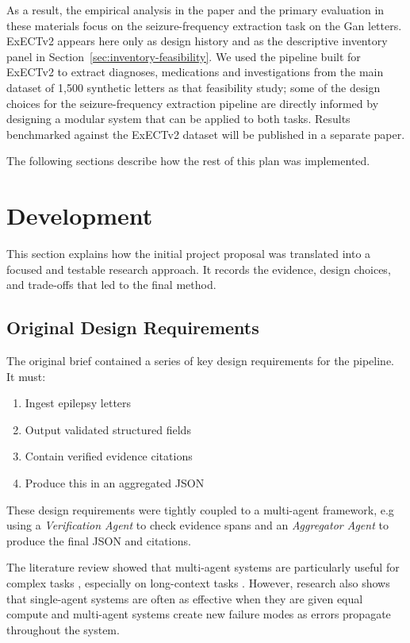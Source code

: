 \documentclass[conference]{IEEEtran}
\begin{document}
As a result, the empirical analysis in the paper and the 
primary evaluation in these materials focus on the 
seizure-frequency extraction task on the Gan letters. 
ExECTv2 appears here only as design history and as the 
descriptive inventory panel in 
Section~\ref{sec:inventory-feasibility}. We used the 
pipeline built for ExECTv2 to extract diagnoses, medications
and investigations from the main dataset of 1,500
synthetic letters as that feasibility study; some of the 
design choices for the seizure-frequency extraction
pipeline are directly informed by designing a modular
system that can be applied to both tasks. Results 
benchmarked against the ExECTv2 dataset will
be published in a separate paper.

The following sections describe how the rest of this 
plan was implemented.

\section{Development}

This section explains how the initial project proposal was 
translated into a focused and testable research approach. 
It records the evidence, design choices, and trade-offs 
that led to the final method.

\subsection{Original Design Requirements}

The original brief contained a series of key design 
requirements for the pipeline. It must:

\vspace{0.2em}
\begin{enumerate}
\item Ingest epilepsy letters
\item Output validated structured fields 
\item Contain verified evidence citations
\item Produce this in an aggregated JSON
\end{enumerate}
\vspace{0.2em}

These design requirements were tightly coupled to a 
multi-agent framework, e.g using a \emph{Verification Agent} 
to check evidence spans and an \emph{Aggregator Agent}
to produce the final JSON and citations. 

The literature review showed that multi-agent systems
are particularly useful for complex tasks \cite{b25},
especially on long-context tasks \cite{b26}. 
However, research also shows that single-agent systems
are often as effective when they are given equal compute 
and multi-agent systems create new failure modes 
as errors propagate throughout the system\cite{b26}.
\end{document}
